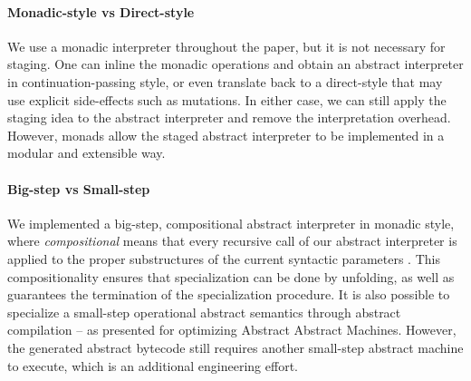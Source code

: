 \paragraph{Monadic-style vs Direct-style} We use a monadic interpreter
throughout the paper, but it is not necessary for staging. One can inline the
monadic operations and obtain an abstract interpreter in continuation-passing
style, or even translate back to a direct-style that may use explicit
side-effects such as mutations. In either case, we can still apply the staging
idea to the abstract interpreter and remove the interpretation overhead.
However, monads allow the staged abstract interpreter to be implemented in a
modular and extensible way.

\paragraph{Big-step vs Small-step}

We implemented a big-step, compositional abstract interpreter in monadic
style, where \textit{compositional} means that every recursive call of our abstract
interpreter is applied to the proper substructures of the current syntactic
parameters \cite{10.1007/3-540-61580-6_11}. This compositionality ensures that
specialization can be done by unfolding, as well as guarantees the termination
of the specialization procedure. It is also possible to specialize a small-step
operational abstract semantics through abstract compilation
\cite{Boucher:1996:ACN:647473.727587} -- as
\citet{Johnson:2013:OAA:2500365.2500604} presented for
optimizing Abstract Abstract Machines. However, the generated abstract
bytecode still requires another small-step abstract machine to execute, which is
an additional engineering effort.
